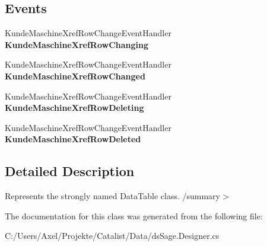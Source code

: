 \subsection*{Events}
\begin{DoxyCompactItemize}
\item 
Kunde\+Maschine\+Xref\+Row\+Change\+Event\+Handler {\bfseries Kunde\+Maschine\+Xref\+Row\+Changing}\hypertarget{class_products_1_1_data_1_1ds_sage_1_1_kunde_maschine_xref_data_table_a5c54b6095444f1f2ac2ead7d9d4fce55}{}\label{class_products_1_1_data_1_1ds_sage_1_1_kunde_maschine_xref_data_table_a5c54b6095444f1f2ac2ead7d9d4fce55}

\item 
Kunde\+Maschine\+Xref\+Row\+Change\+Event\+Handler {\bfseries Kunde\+Maschine\+Xref\+Row\+Changed}\hypertarget{class_products_1_1_data_1_1ds_sage_1_1_kunde_maschine_xref_data_table_ab1f867c3e4f992cff4747387a4d4bbcb}{}\label{class_products_1_1_data_1_1ds_sage_1_1_kunde_maschine_xref_data_table_ab1f867c3e4f992cff4747387a4d4bbcb}

\item 
Kunde\+Maschine\+Xref\+Row\+Change\+Event\+Handler {\bfseries Kunde\+Maschine\+Xref\+Row\+Deleting}\hypertarget{class_products_1_1_data_1_1ds_sage_1_1_kunde_maschine_xref_data_table_a8f327aa350aab339c215a68e60056e63}{}\label{class_products_1_1_data_1_1ds_sage_1_1_kunde_maschine_xref_data_table_a8f327aa350aab339c215a68e60056e63}

\item 
Kunde\+Maschine\+Xref\+Row\+Change\+Event\+Handler {\bfseries Kunde\+Maschine\+Xref\+Row\+Deleted}\hypertarget{class_products_1_1_data_1_1ds_sage_1_1_kunde_maschine_xref_data_table_a87b72ebb37c98403de7e5098b930a564}{}\label{class_products_1_1_data_1_1ds_sage_1_1_kunde_maschine_xref_data_table_a87b72ebb37c98403de7e5098b930a564}

\end{DoxyCompactItemize}


\subsection{Detailed Description}
Represents the strongly named Data\+Table class. /summary$>$ 

The documentation for this class was generated from the following file\+:\begin{DoxyCompactItemize}
\item 
C\+:/\+Users/\+Axel/\+Projekte/\+Catalist/\+Data/ds\+Sage.\+Designer.\+cs\end{DoxyCompactItemize}
